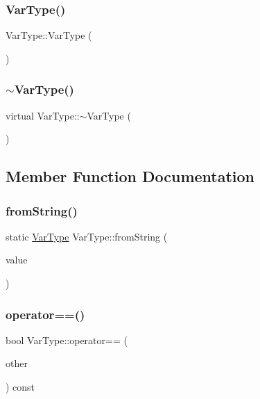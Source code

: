 \subsubsection{\texorpdfstring{Var\+Type()}{VarType()}}
{\footnotesize\ttfamily Var\+Type\+::\+Var\+Type (\begin{DoxyParamCaption}{ }\end{DoxyParamCaption})}

\mbox{\label{classVarType_af090ea0ac8270c1566c592bd9b3df2e6}} 
\subsubsection{\texorpdfstring{$\sim$\+Var\+Type()}{~VarType()}}
{\footnotesize\ttfamily virtual Var\+Type\+::$\sim$\+Var\+Type (\begin{DoxyParamCaption}{ }\end{DoxyParamCaption})\hspace{0.3cm}{\ttfamily [virtual]}}



\subsection{Member Function Documentation}
\mbox{\label{classVarType_ae9fb7114144fc70d399962c25ea24b9c}} 
\subsubsection{\texorpdfstring{from\+String()}{fromString()}}
{\footnotesize\ttfamily static \hyperlink{classVarType}{Var\+Type} Var\+Type\+::from\+String (\begin{DoxyParamCaption}\item[{std\+::string}]{value }\end{DoxyParamCaption})\hspace{0.3cm}{\ttfamily [static]}}

\mbox{\label{classVarType_a28323b657730e9b806f4b87af777de43}} 
\subsubsection{\texorpdfstring{operator==()}{operator==()}}
{\footnotesize\ttfamily bool Var\+Type\+::operator== (\begin{DoxyParamCaption}\item[{const \hyperlink{classVarType}{Var\+Type} \&}]{other }\end{DoxyParamCaption}) const}



